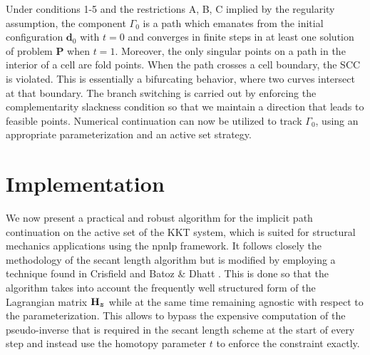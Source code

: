 Under conditions 1-5 and the restrictions A, B, C implied by the regularity 
assumption, the component $\mathit{\Gamma_0}$ is a path which emanates from 
the initial configuration $\bm{d}_0$ with $t=0$ and converges in finite steps 
in at least 
one solution
of problem \textbf{P} when $t=1$. Moreover, the only singular points
on a path in the interior of a cell are fold points. When the path crosses a
cell boundary, the SCC is violated. This is essentially a bifurcating behavior, 
where two curves intersect at that boundary. The branch switching is carried
out by enforcing the complementarity slackness condition so that we maintain a
direction that leads to feasible points. Numerical continuation 
can now be utilized to track $\mathit{\Gamma_0}$, using an appropriate
parameterization and an active set strategy.


\section{Implementation}\label{CH4-S3}

We now present a practical and robust algorithm for the implicit path
continuation on the active set of the KKT system, which is suited for 
structural 
mechanics applications using the
\acrshort{npnlp} framework. It follows closely
the methodology of the secant length algorithm\cite{Menzel:1985} but is modified
by employing a technique found in Crisfield\cite{Crisfield3} and Batoz \& Dhatt 
\cite{Batoz:1979}. This is done
so that the algorithm takes into account the frequently well structured form of 
the
Lagrangian matrix $\mathbf{H}_{\bm{z}}$ while at the same time remaining agnostic
with respect to the parameterization. This allows to bypass the expensive
computation of the pseudo-inverse that is required in the secant length scheme
at the start of every step and instead use the homotopy
parameter $t$ to enforce the constraint exactly. 

